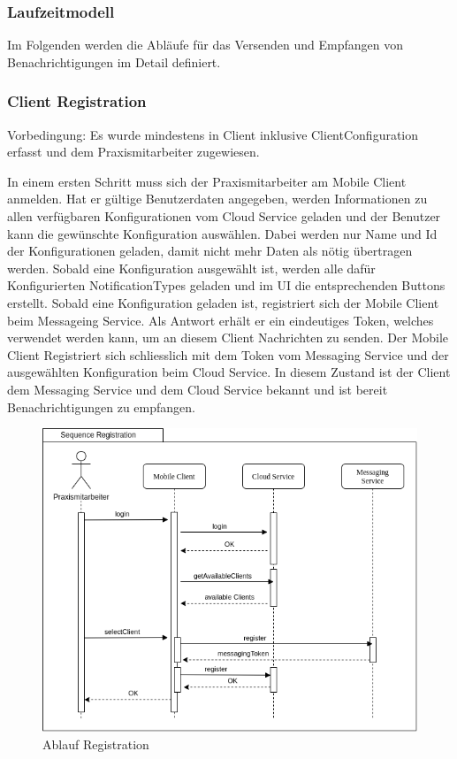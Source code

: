 \clearpage
\subsubsection{Laufzeitmodell}

Im Folgenden werden die Abläufe für das Versenden und Empfangen von Benachrichtigungen im Detail definiert.

\subsubsection*{Client Registration}

Vorbedingung: Es wurde mindestens in Client inklusive ClientConfiguration erfasst und dem Praxismitarbeiter zugewiesen.

In einem ersten Schritt muss sich der Praxismitarbeiter am Mobile Client anmelden.
Hat er gültige Benutzerdaten angegeben, werden Informationen zu allen verfügbaren Konfigurationen vom Cloud Service geladen und der Benutzer kann die gewünschte Konfiguration auswählen.
Dabei werden nur Name und Id der Konfigurationen geladen, damit nicht mehr Daten als nötig übertragen werden.
Sobald eine Konfiguration ausgewählt ist, werden alle dafür Konfigurierten NotificationTypes geladen und im UI die entsprechenden Buttons erstellt.
Sobald eine Konfiguration geladen ist, registriert sich der Mobile Client beim Messageing Service.
Als Antwort erhält er ein eindeutiges Token, welches verwendet werden kann, um an diesem Client Nachrichten zu senden.
Der Mobile Client Registriert sich schliesslich mit dem Token vom Messaging Service und der ausgewählten Konfiguration beim Cloud Service.
In diesem Zustand ist der Client dem Messaging Service und dem Cloud Service bekannt und ist bereit Benachrichtigungen zu empfangen.

\begin{figure}[h]
    \centering
    \begin{minipage}[b]{0.9\textwidth}
        \includegraphics[width=\textwidth]{graphics/Sequence_Notification_Register}
        \caption{Ablauf Registration}
    \end{minipage}
\end{figure}


